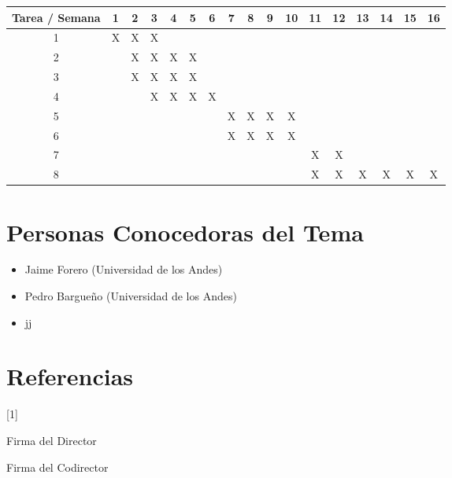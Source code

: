 \documentclass{article}
\begin{document}
\begin{table}[htb]

\begin{tabular}{|c||c|c|c|c|c|c|c|c|c|c|c|c|c|c|c|c| }

\hline
Tarea / Semana & 1 & 2 & 3 & 4 & 5 & 6 & 7 & 8 & 9 & 10 & 11 & 12 & 13 & 14 & 15 & 16  \\
\hline\hline
1 & X & X & X &   &   &   &   &   &   &   &   &   &   &   &   &   \\
\hline
2 &   & X & X & X & X &   &   &   &   &   &   &   &   &   &   &   \\
\hline
3 &   & X & X & X & X &   &   &   &   &   &   &   &   &   &   &   \\
\hline
4 &   &   & X & X & X & X &   &   &   &   &   &   &   &   &   &   \\
\hline
5 &   &   &   &   &   &   & X & X & X & X &   &   &   &   &   &   \\
\hline
6 &   &   &   &   &   &   & X & X & X & X &   &   &   &   &   &   \\
\hline
7 &   &   &   &   &   &   &   &   &   &   & X & X &   &   &   &   \\
\hline
8 &   &   &   &   &   &   &   &   &   &   & X & X & X & X & X & X \\
\hline

\end{tabular}

\end{table}

\section{Personas Conocedoras del Tema}

\begin{itemize}

\item Jaime Forero (Universidad de los Andes)
\item Pedro Bargueño (Universidad de los Andes)
\item jj

\end{itemize}


\section{Referencias}

[1] 


Firma del Director


Firma del Codirector
\end{document}
